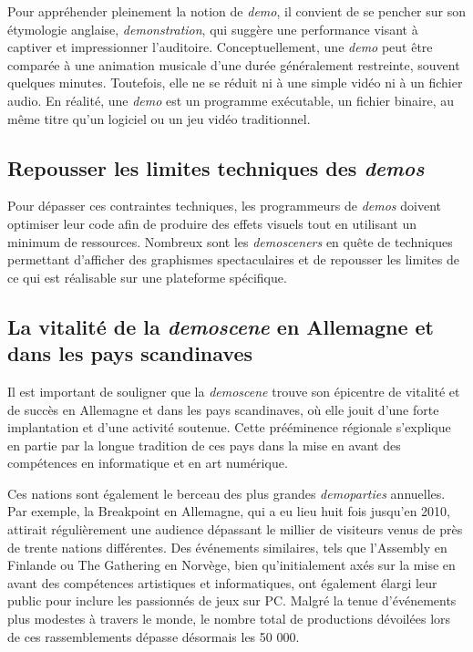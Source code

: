 Pour appréhender pleinement la notion de \textit{demo}, il convient de se pencher sur son étymologie anglaise, \textit{demonstration}, qui suggère une performance visant à captiver et impressionner l'auditoire. Conceptuellement, une \textit{demo} peut être comparée à une animation musicale d'une durée généralement restreinte, souvent quelques minutes. Toutefois, elle ne se réduit ni à une simple vidéo ni à un fichier audio. En réalité, une \textit{demo} est un programme exécutable, un fichier binaire, au même titre qu'un logiciel ou un jeu vidéo traditionnel.

\subsection*{Repousser les limites techniques des \textit{demos}}

Pour dépasser ces contraintes techniques, les programmeurs de \textit{demos} doivent optimiser leur code afin de produire des effets visuels tout en utilisant un minimum de ressources. Nombreux sont les \textit{demosceners} en quête de techniques permettant d'afficher des graphismes spectaculaires et de repousser les limites de ce qui est réalisable sur une plateforme spécifique.

\subsection*{La vitalité de la \textit{demoscene} en Allemagne et dans les pays scandinaves}




Il est important de souligner que la \textit{demoscene} trouve son épicentre de vitalité et de succès en Allemagne et dans les pays scandinaves, où elle jouit d'une forte implantation et d'une activité soutenue. Cette prééminence régionale s'explique en partie par la longue tradition de ces pays dans la mise en avant des compétences en informatique et en art numérique.

Ces nations sont également le berceau des plus grandes \textit{demoparties} annuelles. Par exemple, la Breakpoint en Allemagne, qui a eu lieu huit fois jusqu'en 2010, attirait régulièrement une audience dépassant le millier de visiteurs venus de près de trente nations différentes. Des événements similaires, tels que l'Assembly en Finlande ou The Gathering en Norvège, bien qu'initialement axés sur la mise en avant des compétences artistiques et informatiques, ont également élargi leur public pour inclure les passionnés de jeux sur PC. Malgré la tenue d'événements plus modestes à travers le monde, le nombre total de productions dévoilées lors de ces rassemblements dépasse désormais les 50 000. 




